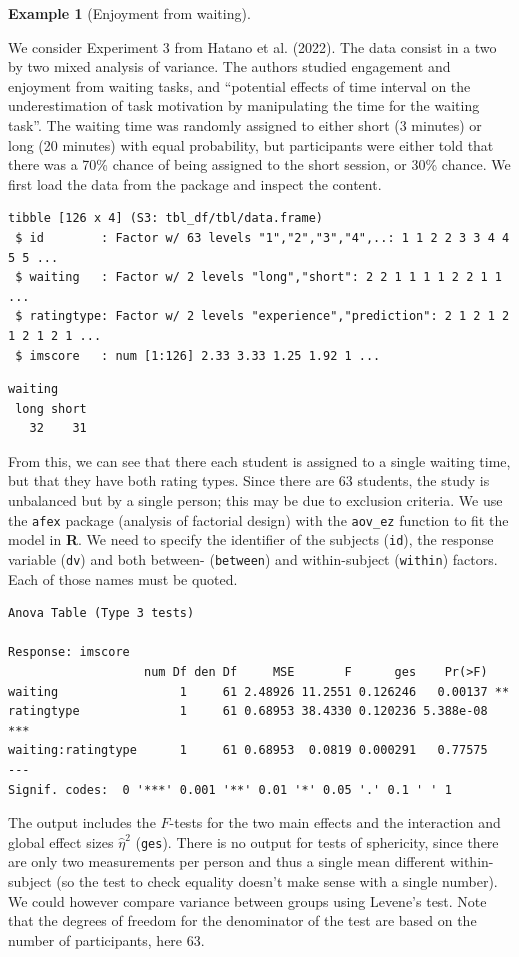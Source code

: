 \documentclass[
  11pt,
  letterpaper,
]{scrbook}
\theoremstyle{definition}
\theoremstyle{definition}
\newtheorem{example}{Example}[chapter]
\theoremstyle{remark}
\begin{document}
\begin{example}[Enjoyment from
waiting]\protect\hypertarget{exm-waiting}{}\label{exm-waiting}

We consider Experiment 3 from Hatano et al. (2022). The data consist in
a two by two mixed analysis of variance. The authors studied engagement
and enjoyment from waiting tasks, and ``potential effects of time
interval on the underestimation of task motivation by manipulating the
time for the waiting task''. The waiting time was randomly assigned to
either short (3 minutes) or long (20 minutes) with equal probability,
but participants were either told that there was a 70\% chance of being
assigned to the short session, or 30\% chance. We first load the data
from the package and inspect the content.

\begin{verbatim}
tibble [126 x 4] (S3: tbl_df/tbl/data.frame)
 $ id        : Factor w/ 63 levels "1","2","3","4",..: 1 1 2 2 3 3 4 4 5 5 ...
 $ waiting   : Factor w/ 2 levels "long","short": 2 2 1 1 1 1 2 2 1 1 ...
 $ ratingtype: Factor w/ 2 levels "experience","prediction": 2 1 2 1 2 1 2 1 2 1 ...
 $ imscore   : num [1:126] 2.33 3.33 1.25 1.92 1 ...
\end{verbatim}

\begin{verbatim}
waiting
 long short 
   32    31 
\end{verbatim}

From this, we can see that there each student is assigned to a single
waiting time, but that they have both rating types. Since there are 63
students, the study is unbalanced but by a single person; this may be
due to exclusion criteria. We use the \texttt{afex} package (analysis of
factorial design) with the \texttt{aov\_ez} function to fit the model in
\textbf{R}. We need to specify the identifier of the subjects
(\texttt{id}), the response variable (\texttt{dv}) and both between-
(\texttt{between}) and within-subject (\texttt{within}) factors. Each of
those names must be quoted.

\begin{verbatim}
Anova Table (Type 3 tests)

Response: imscore
                   num Df den Df     MSE       F      ges    Pr(>F)    
waiting                 1     61 2.48926 11.2551 0.126246   0.00137 ** 
ratingtype              1     61 0.68953 38.4330 0.120236 5.388e-08 ***
waiting:ratingtype      1     61 0.68953  0.0819 0.000291   0.77575    
---
Signif. codes:  0 '***' 0.001 '**' 0.01 '*' 0.05 '.' 0.1 ' ' 1
\end{verbatim}

The output includes the \(F\)-tests for the two main effects and the
interaction and global effect sizes \(\widehat{\eta}^2\) (\texttt{ges}).
There is no output for tests of sphericity, since there are only two
measurements per person and thus a single mean different within-subject
(so the test to check equality doesn't make sense with a single number).
We could however compare variance between groups using Levene's test.
Note that the degrees of freedom for the denominator of the test are
based on the number of participants, here 63.

\end{example}
\end{document}
